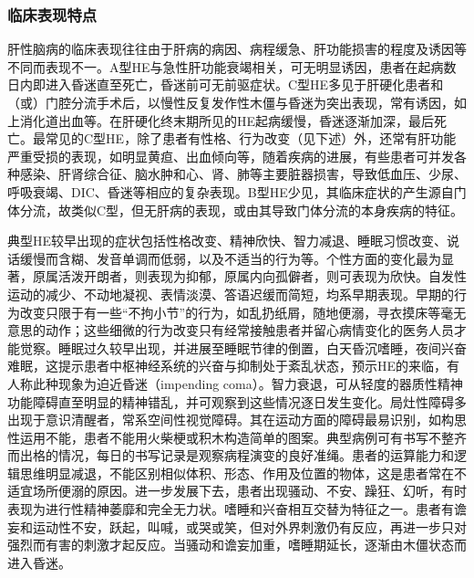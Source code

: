 \subsubsection{临床表现特点}

肝性脑病的临床表现往往由于肝病的病因、病程缓急、肝功能损害的程度及诱因等不同而表现不一。A型HE与急性肝功能衰竭相关，可无明显诱因，患者在起病数日内即进入昏迷直至死亡，昏迷前可无前驱症状。C型HE多见于肝硬化患者和（或）门腔分流手术后，以慢性反复发作性木僵与昏迷为突出表现，常有诱因，如上消化道出血等。在肝硬化终末期所见的HE起病缓慢，昏迷逐渐加深，最后死亡。最常见的C型HE，除了患者有性格、行为改变（见下述）外，还常有肝功能严重受损的表现，如明显黄疸、出血倾向等，随着疾病的进展，有些患者可并发各种感染、肝肾综合征、脑水肿和心、肾、肺等主要脏器损害，导致低血压、少尿、呼吸衰竭、DIC、昏迷等相应的复杂表现。B型HE少见，其临床症状的产生源自门体分流，故类似C型，但无肝病的表现，或由其导致门体分流的本身疾病的特征。

典型HE较早出现的症状包括性格改变、精神欣快、智力减退、睡眠习惯改变、说话缓慢而含糊、发音单调而低弱，以及不适当的行为等。个性方面的变化最为显著，原属活泼开朗者，则表现为抑郁，原属内向孤僻者，则可表现为欣快。自发性运动的减少、不动地凝视、表情淡漠、答语迟缓而简短，均系早期表现。早期的行为改变只限于有一些“不拘小节”的行为，如乱扔纸屑，随地便溺，寻衣摸床等毫无意思的动作；这些细微的行为改变只有经常接触患者并留心病情变化的医务人员才能觉察。睡眠过久较早出现，并进展至睡眠节律的倒置，白天昏沉嗜睡，夜间兴奋难眠，这提示患者中枢神经系统的兴奋与抑制处于紊乱状态，预示HE的来临，有人称此种现象为迫近昏迷（impending
coma）。智力衰退，可从轻度的器质性精神功能障碍直至明显的精神错乱，并可观察到这些情况逐日发生变化。局灶性障碍多出现于意识清醒者，常系空间性视觉障碍。其在运动方面的障碍最易识别，如构思性运用不能，患者不能用火柴梗或积木构造简单的图案。典型病例可有书写不整齐而出格的情况，每日的书写记录是观察病程演变的良好准绳。患者的运算能力和逻辑思维明显减退，不能区别相似体积、形态、作用及位置的物体，这是患者常在不适宜场所便溺的原因。进一步发展下去，患者出现骚动、不安、躁狂、幻听，有时表现为进行性精神萎靡和完全无力状。嗜睡和兴奋相互交替为特征之一。患者有谵妄和运动性不安，跃起，叫喊，或哭或笑，但对外界刺激仍有反应，再进一步只对强烈而有害的刺激才起反应。当骚动和谵妄加重，嗜睡期延长，逐渐由木僵状态而进入昏迷。

